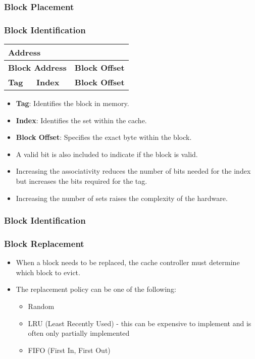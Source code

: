 \begin{frame}
    \frametitle{Block Placement}
\end{frame}

\begin{frame}
    \frametitle{Block Identification}
    \begin{table}[h!]
        \centering
        \begin{tabular}{|p{5cm}|p{3cm}|p{3cm}|}
            \hline
            \multicolumn{3}{|p{11cm}|}{\textbf{Address}} \\
            \hline
            \multicolumn{2}{|p{8cm}|}{\textbf{Block Address}} & \multicolumn{1}{p{3cm}|}{\textbf{Block Offset}} \\
            \hline
            \multicolumn{1}{|p{5cm}|}{\textbf{Tag}} & \multicolumn{1}{|p{3cm}|}{\textbf{Index}} & \multicolumn{1}{p{3cm}|}{\textbf{Block Offset}} \\
            \hline
        \end{tabular}
    \end{table}
    \begin{itemize}
        \item \textbf{Tag}: Identifies the block in memory.
        \item \textbf{Index}: Identifies the set within the cache.
        \item \textbf{Block Offset}: Specifies the exact byte within the block.
        \item A valid bit is also included to indicate if the block is valid.
        \item Increasing the associativity reduces the number of bits needed for the index but increases the bits required for the tag.
        \item Increasing the number of sets raises the complexity of the hardware.
    \end{itemize}
\end{frame}

\begin{frame}
    \frametitle{Block Identification}
\end{frame}

\begin{frame}
    \frametitle{Block Replacement}
    \begin{itemize}
        \item When a block needs to be replaced, the cache controller must determine which block to evict.
        \item The replacement policy can be one of the following:
        \begin{itemize}
            \item Random
            \item LRU (Least Recently Used) - this can be expensive to implement and is often only partially implemented
            \item FIFO (First In, First Out)
        \end{itemize}
    \end{itemize}
\end{frame}

